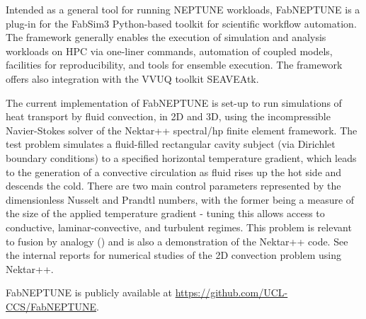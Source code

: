 
Intended as a general tool for running NEPTUNE workloads, FabNEPTUNE is a plug-in for the FabSim3 Python-based toolkit
 for scientific workflow automation.  The framework generally enables the execution of simulation and analysis workloads
 on HPC via one-liner commands, automation of coupled models, facilities for reproducibility, and tools for ensemble
execution.  The framework offers also integration with the VVUQ toolkit SEAVEAtk. 

The current implementation of FabNEPTUNE is set-up to run simulations of heat transport by fluid convection, in 2D and
 3D, using the incompressible Navier-Stokes solver of the Nektar++ spectral/hp finite element framework.  The test 
problem simulates a fluid-filled rectangular cavity subject (via Dirichlet boundary conditions) to a specified 
horizontal temperature gradient, which leads to the generation of a convective circulation as fluid rises up the hot 
side and descends the cold.  There are two main control parameters represented by the dimensionless Nusselt and 
Prandtl numbers, with the former being a measure of the size of the applied temperature gradient - tuning this 
allows access to conductive, laminar-convective, and turbulent regimes.  This problem is relevant to fusion by 
analogy (\cite{Wi19Stab}) and is also a demonstration of the Nektar++ code.  See the internal reports \cite{y3re61,
y3re62} for numerical studies of the 2D convection problem using Nektar++.

FabNEPTUNE is publicly available at \url{https://github.com/UCL-CCS/FabNEPTUNE}.
